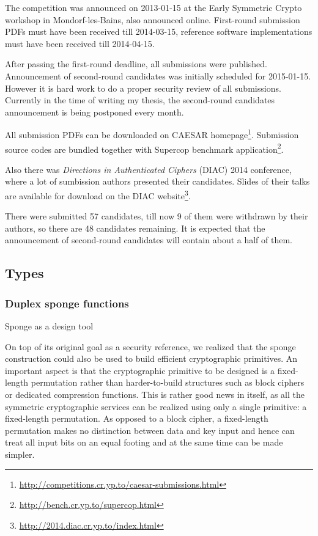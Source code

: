 The competition was announced on 2013-01-15 at the Early Symmetric Crypto workshop in Mondorf-les-Bains, also announced online. First-round submission PDFs must have been received till 2014-03-15, reference software implementations must have been received till 2014-04-15.

After passing the first-round deadline, all submissions were published. Announcement of second-round candidates was initially scheduled for 2015-01-15. However it is hard work to do a proper security review of all submissions. Currently in the time of writing my thesis, the second-round candidates announcement is being postponed every month.

All submission PDFs can be downloaded on CAESAR homepage\footnote{\url{http://competitions.cr.yp.to/caesar-submissions.html}}. Submission source codes are bundled together with Supercop benchmark application\footnote{\url{http://bench.cr.yp.to/supercop.html}}.

Also there was \textit{Directions in Authenticated Ciphers} (DIAC) 2014 conference, where a lot of sumbission authors presented their candidates. Slides of their talks are available for download on the DIAC website\footnote{\url{http://2014.diac.cr.yp.to/index.html}}.

There were submitted 57 candidates, till now 9 of them were withdrawn by their authors, so there are 48 candidates remaining. It is expected that the announcement of second-round candidates will contain about a half of them.



\subsection{Types}

\subsubsection{Duplex sponge functions}

Sponge as a design tool

On top of its original goal as a security reference, we realized that the sponge construction could also be used to build efficient cryptographic primitives. An important aspect is that the cryptographic primitive to be designed is a fixed-length permutation rather than harder-to-build structures such as block ciphers or dedicated compression functions. This is rather good news in itself, as all the symmetric cryptographic services can be realized using only a single primitive: a fixed-length permutation. As opposed to a block cipher, a fixed-length permutation makes no distinction between data and key input and hence can treat all input bits on an equal footing and at the same time can be made simpler.

